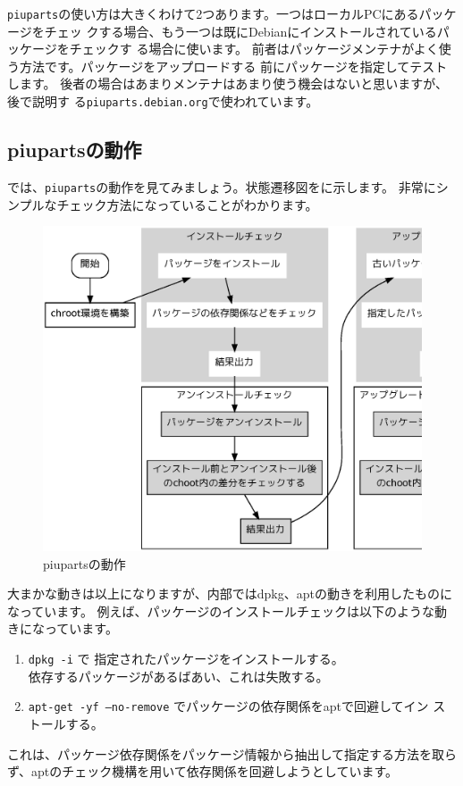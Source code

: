 \documentclass[mingoth,a4paper]{jsarticle}
\begin{document}
\texttt{piuparts}の使い方は大きくわけて2つあります。一つはローカルPCにあるパッケージをチェッ
クする場合、もう一つは既にDebianにインストールされているパッケージをチェックす
る場合に使います。
前者はパッケージメンテナがよく使う方法です。パッケージをアップロードする
前にパッケージを指定してテストします。
後者の場合はあまりメンテナはあまり使う機会はないと思いますが、後で説明す
る\texttt{piuparts.debian.org}で使われています。

\subsection{piupartsの動作}
では、\texttt{piuparts}の動作を見てみましょう。状態遷移図をに示します。
非常にシンプルなチェック方法になっていることがわかります。

\begin{figure}[H]
\begin{center}
\includegraphics[height=0.8\hsize]{image201004/piuparts-process.eps}
\caption{piupartsの動作}
\label{fig:piuparts-process}
\end{center}
\end{figure}

大まかな動きは以上になりますが、内部ではdpkg、aptの動きを利用したものに
なっています。
例えば、パッケージのインストールチェックは以下のような動きになっています。
\begin{enumerate}
\item \texttt{dpkg -i} で 指定されたパッケージをインストールする。\\
依存するパッケージがあるばあい、これは失敗する。
\item \texttt{apt-get -yf --no-remove} でパッケージの依存関係をaptで回避してイン
      ストールする。
\end{enumerate}
これは、パッケージ依存関係をパッケージ情報から抽出して指定する方法を取ら
ず、aptのチェック機構を用いて依存関係を回避しようとしています。
\end{document}
